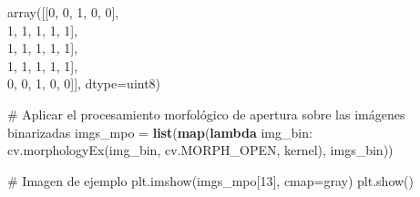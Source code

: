 \documentclass[
]{article}
\newenvironment{Shaded}{\begin{snugshade}}{\end{snugshade}}
\newcommand{\BuiltInTok}[1]{\textcolor[rgb]{0.39,0.29,0.61}{\textbf{#1}}}
\newcommand{\CommentTok}[1]{\textcolor[rgb]{0.54,0.53,0.53}{#1}}
\newcommand{\DecValTok}[1]{\textcolor[rgb]{0.69,0.50,0.00}{#1}}
\newcommand{\KeywordTok}[1]{\textcolor[rgb]{0.12,0.11,0.11}{\textbf{#1}}}
\newcommand{\NormalTok}[1]{\textcolor[rgb]{0.12,0.11,0.11}{#1}}
\newcommand{\OperatorTok}[1]{\textcolor[rgb]{0.12,0.11,0.11}{#1}}
\newcommand{\StringTok}[1]{\textcolor[rgb]{0.75,0.01,0.01}{#1}}
\begin{document}
array({[}{[}0, 0, 1, 0, 0{]},\\
\hspace*{0.333em}\hspace*{0.333em}\hspace*{0.333em}\hspace*{0.333em}\hspace*{0.333em}\hspace*{0.333em}\hspace*{0.333em}{[}1,
1, 1, 1, 1{]},\\
\hspace*{0.333em}\hspace*{0.333em}\hspace*{0.333em}\hspace*{0.333em}\hspace*{0.333em}\hspace*{0.333em}\hspace*{0.333em}{[}1,
1, 1, 1, 1{]},\\
\hspace*{0.333em}\hspace*{0.333em}\hspace*{0.333em}\hspace*{0.333em}\hspace*{0.333em}\hspace*{0.333em}\hspace*{0.333em}{[}1,
1, 1, 1, 1{]},\\
\hspace*{0.333em}\hspace*{0.333em}\hspace*{0.333em}\hspace*{0.333em}\hspace*{0.333em}\hspace*{0.333em}\hspace*{0.333em}{[}0,
0, 1, 0, 0{]}{]}, dtype=uint8)

\begin{Shaded}
\begin{Highlighting}[]
\CommentTok{\# Aplicar el procesamiento morfológico de apertura sobre las imágenes binarizadas}
\NormalTok{imgs\_mpo }\OperatorTok{=} \BuiltInTok{list}\NormalTok{(}\BuiltInTok{map}\NormalTok{(}\KeywordTok{lambda}\NormalTok{ img\_bin: cv.morphologyEx(img\_bin, cv.MORPH\_OPEN, kernel), imgs\_bin))}

\CommentTok{\# Imagen de ejemplo}
\NormalTok{plt.imshow(imgs\_mpo[}\DecValTok{13}\NormalTok{], cmap}\OperatorTok{=}\StringTok{\textquotesingle{}gray\textquotesingle{}}\NormalTok{)}
\NormalTok{plt.show()}
\end{Highlighting}
\end{Shaded}
\end{document}
